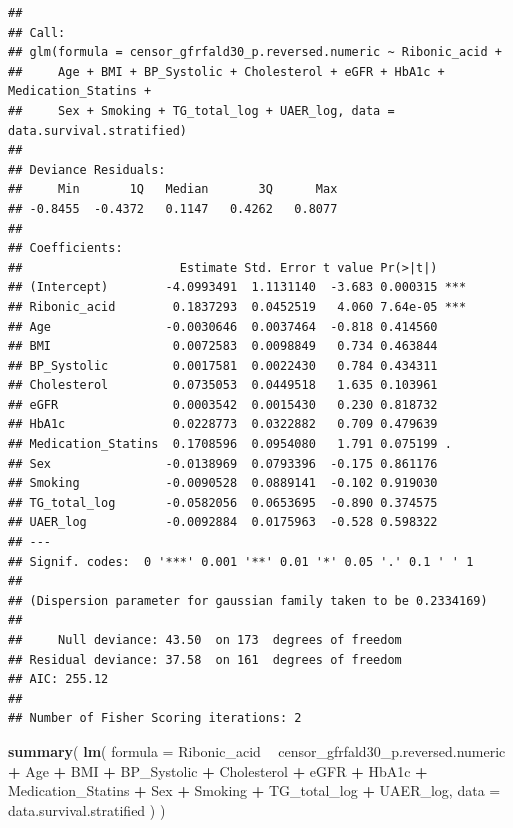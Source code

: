 \documentclass[]{article}
\newenvironment{Shaded}{\begin{snugshade}}{\end{snugshade}}
\newcommand{\DataTypeTok}[1]{\textcolor[rgb]{0.13,0.29,0.53}{#1}}
\newcommand{\KeywordTok}[1]{\textcolor[rgb]{0.13,0.29,0.53}{\textbf{#1}}}
\newcommand{\NormalTok}[1]{#1}
\newcommand{\OperatorTok}[1]{\textcolor[rgb]{0.81,0.36,0.00}{\textbf{#1}}}
\newcommand{\StringTok}[1]{\textcolor[rgb]{0.31,0.60,0.02}{#1}}
\begin{document}
\begin{verbatim}
## 
## Call:
## glm(formula = censor_gfrfald30_p.reversed.numeric ~ Ribonic_acid + 
##     Age + BMI + BP_Systolic + Cholesterol + eGFR + HbA1c + Medication_Statins + 
##     Sex + Smoking + TG_total_log + UAER_log, data = data.survival.stratified)
## 
## Deviance Residuals: 
##     Min       1Q   Median       3Q      Max  
## -0.8455  -0.4372   0.1147   0.4262   0.8077  
## 
## Coefficients:
##                      Estimate Std. Error t value Pr(>|t|)    
## (Intercept)        -4.0993491  1.1131140  -3.683 0.000315 ***
## Ribonic_acid        0.1837293  0.0452519   4.060 7.64e-05 ***
## Age                -0.0030646  0.0037464  -0.818 0.414560    
## BMI                 0.0072583  0.0098849   0.734 0.463844    
## BP_Systolic         0.0017581  0.0022430   0.784 0.434311    
## Cholesterol         0.0735053  0.0449518   1.635 0.103961    
## eGFR                0.0003542  0.0015430   0.230 0.818732    
## HbA1c               0.0228773  0.0322882   0.709 0.479639    
## Medication_Statins  0.1708596  0.0954080   1.791 0.075199 .  
## Sex                -0.0138969  0.0793396  -0.175 0.861176    
## Smoking            -0.0090528  0.0889141  -0.102 0.919030    
## TG_total_log       -0.0582056  0.0653695  -0.890 0.374575    
## UAER_log           -0.0092884  0.0175963  -0.528 0.598322    
## ---
## Signif. codes:  0 '***' 0.001 '**' 0.01 '*' 0.05 '.' 0.1 ' ' 1
## 
## (Dispersion parameter for gaussian family taken to be 0.2334169)
## 
##     Null deviance: 43.50  on 173  degrees of freedom
## Residual deviance: 37.58  on 161  degrees of freedom
## AIC: 255.12
## 
## Number of Fisher Scoring iterations: 2
\end{verbatim}

\begin{Shaded}
\begin{Highlighting}[]
\KeywordTok{summary}\NormalTok{(}
  \KeywordTok{lm}\NormalTok{(}
    \DataTypeTok{formula =}
\NormalTok{      Ribonic_acid }\OperatorTok{~}\StringTok{ }
\StringTok{      }\NormalTok{censor_gfrfald30_p.reversed.numeric }\OperatorTok{+}\StringTok{ }
\StringTok{      }\NormalTok{Age }\OperatorTok{+}
\StringTok{      }\NormalTok{BMI }\OperatorTok{+}\StringTok{ }
\StringTok{      }\NormalTok{BP_Systolic }\OperatorTok{+}\StringTok{ }
\StringTok{      }\NormalTok{Cholesterol }\OperatorTok{+}\StringTok{ }
\StringTok{      }\NormalTok{eGFR }\OperatorTok{+}\StringTok{ }
\StringTok{      }\NormalTok{HbA1c }\OperatorTok{+}
\StringTok{      }\NormalTok{Medication_Statins }\OperatorTok{+}
\StringTok{      }\NormalTok{Sex }\OperatorTok{+}\StringTok{  }
\StringTok{      }\NormalTok{Smoking }\OperatorTok{+}\StringTok{ }
\StringTok{      }\NormalTok{TG_total_log }\OperatorTok{+}
\StringTok{      }\NormalTok{UAER_log, }
    \DataTypeTok{data =}\NormalTok{ data.survival.stratified}
\NormalTok{  )}
\NormalTok{)}
\end{Highlighting}
\end{Shaded}
\end{document}
